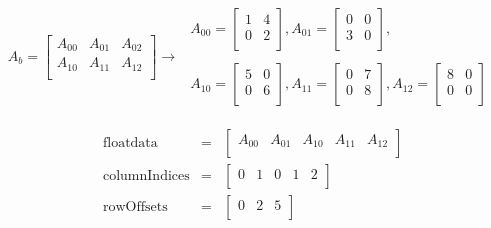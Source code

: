 \begin{itemize}
\[
A_{b} = \begin{bmatrix}
A_{00} & A_{01} & A_{02} \\
A_{10} & A_{11} & A_{12} \\
\end{bmatrix}
\rightarrow
\begin{matrix}

\begin{matrix}
A_{00} = \begin{bmatrix}
1 & 4 \\
0 & 2 \\
\end{bmatrix},
A_{01} = \begin{bmatrix}
0 & 0 \\
3 & 0 \\
\end{bmatrix},
\end{matrix}

\\

\begin{matrix}
A_{10} = \begin{bmatrix}
5 & 0 \\
0 & 6 \\
\end{bmatrix},
A_{11} = \begin{bmatrix}
0 & 7 \\
0 & 8 \\
\end{bmatrix},
A_{12} = \begin{bmatrix}
8 & 0 \\
0 & 0 \\
\end{bmatrix}
\end{matrix}

\end{matrix}
\]

\[
\begin{matrix}
\text{floatdata} & = & \begin{bmatrix}
A_{00} & A_{01} & A_{10} & A_{11} & A_{12} \\
\end{bmatrix} \\
\text{columnIndices} & = & \begin{bmatrix}
0 & 1 & 0 & 1 & 2 \\
\end{bmatrix} \\
\text{rowOffsets} & = & \begin{bmatrix}
0 & 2 & 5 \\
\end{bmatrix} \\
\end{matrix}
\]
    
\end{itemize}

